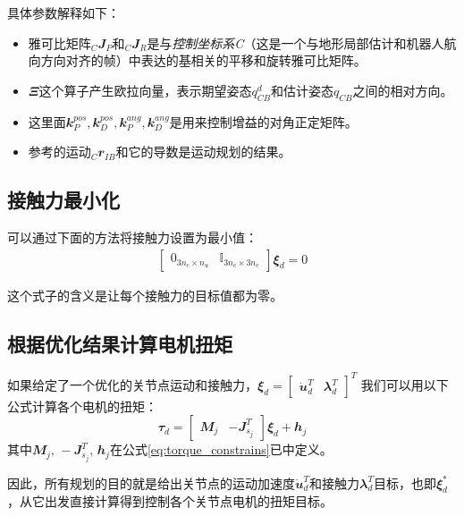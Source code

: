 具体参数解释如下：
\begin{itemize}
    \item 雅可比矩阵$_C{\mathbfit J}_P$和$_C{\mathbfit J}_R$是与\emph{控制坐标系C}（这是一个与地形局部估计和机器人航向方向对齐的帧）中表达的基相关的平移和旋转雅可比矩阵。
    \item ${\mathbfit \Xi}$这个算子产生欧拉向量，表示期望姿态$q^d_{CB}$和估计姿态$q_{CB}$之间的相对方向。
    \item 这里面${\mathbfit k}_P^{pos}, {\mathbfit k}_D^{pos}, {\mathbfit k}_P^{ang}, {\mathbfit k}_D^{ang}$是用来控制增益的对角正定矩阵。
    \item 参考的运动$_C{\mathbfit r}_{IB}$和它的导数是运动规划的结果。
\end{itemize}

\subsection[接触力最小化]{接触力最小化}
可以通过下面的方法将接触力设置为最小值：
\begin{align}
    \begin{bmatrix}
    {\mathbfit 0}_{3n_c \times n_u} & {\mathbb I}_{3n_c \times 3n_c}
    \end{bmatrix}
    {\mathbfit \xi}_d = 0
\end{align}

这个式子的含义是让每个接触力的目标值都为零。

\subsection[根据优化结果计算电机扭矩]{根据优化结果计算电机扭矩}

如果给定了一个优化的关节点运动和接触力，${\mathbfit \xi}_d = \begin{bmatrix}
\dot {\mathbfit u}_d^T & {\mathbfit \lambda}_d^T
\end{bmatrix}^T$
我们可以用以下公式计算各个电机的扭矩：
$${\mathbfit \tau}_d = \begin{bmatrix} {\mathbfit M}_j & -{\mathbfit J}^T_{s_j}\end{bmatrix} {\mathbfit \xi}_d + {\mathbfit h}_j$$
其中${\mathbfit M}_j,\, -{\mathbfit J}^T_{s_j}, \, {\mathbfit h}_j$在公式\eqref{eq:torque_constrains}已中定义。

因此，所有规划的目的就是给出关节点的运动加速度$\dot{\mathbfit u}_d^T$和接触力${\mathbfit \lambda}_d^T$目标，也即$\mathbfit{\xi}_d^*$，从它出发直接计算得到控制各个关节点电机的扭矩目标。












